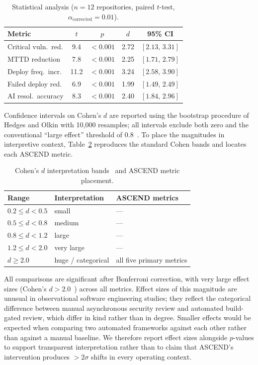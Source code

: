 \documentclass{ieeeaccess}
\begin{document}
\begin{table}[!t]
\caption{Statistical analysis ($n = 12$ repositories, paired $t$-test, $\alpha_{\mathrm{corrected}} = 0.01$).}
\label{tab:stats}
\centering
\begin{tabular}{lcccc}
\hline
\textbf{Metric} & {\bfseries$t$} & {\bfseries$p$} & {\bfseries$d$} & \textbf{95\% CI} \\
\hline
Critical vuln.\ red.   & 9.4  & $<0.001$ & 2.72 & $[2.13,\,3.31]$ \\
MTTD reduction         & 7.8  & $<0.001$ & 2.25 & $[1.71,\,2.79]$ \\
Deploy freq.\ incr.    & 11.2 & $<0.001$ & 3.24 & $[2.58,\,3.90]$ \\
Failed deploy red.     & 6.9  & $<0.001$ & 1.99 & $[1.49,\,2.49]$ \\
AI resol.\ accuracy    & 8.3  & $<0.001$ & 2.40 & $[1.84,\,2.96]$ \\
\hline
\end{tabular}
\end{table}

Confidence intervals on Cohen's $d$ are reported using the bootstrap procedure of Hedges and Olkin with 10{,}000 resamples; all intervals exclude both zero and the conventional ``large effect'' threshold of $0.8$~\cite{cohen1988statistical}. To place the magnitudes in interpretive context, Table~\ref{tab:effect-bands} reproduces the standard Cohen bands and locates each ASCEND metric.

\begin{table}[!t]
\caption{Cohen's $d$ interpretation bands~\cite{cohen1988statistical} and ASCEND metric placement.}
\label{tab:effect-bands}
\centering
\begin{tabular}{lll}
\hline
\textbf{Range} & \textbf{Interpretation} & \textbf{ASCEND metrics} \\
\hline
$0.2 \leq d < 0.5$  & small       & --- \\
$0.5 \leq d < 0.8$  & medium      & --- \\
$0.8 \leq d < 1.2$  & large       & --- \\
$1.2 \leq d < 2.0$  & very large  & --- \\
$d \geq 2.0$        & huge / categorical & all five primary metrics \\
\hline
\end{tabular}
\end{table}

All comparisons are significant after Bonferroni correction, with very large effect sizes (Cohen's $d > 2.0$~\cite{cohen1988statistical}) across all metrics. Effect sizes of this magnitude are unusual in observational software engineering studies; they reflect the categorical difference between manual asynchronous security review and automated build-gated review, which differ in kind rather than in degree. Smaller effects would be expected when comparing two automated frameworks against each other rather than against a manual baseline. We therefore report effect sizes alongside $p$-values to support transparent interpretation rather than to claim that ASCEND's intervention produces $> 2\sigma$ shifts in every operating context.
\end{document}
